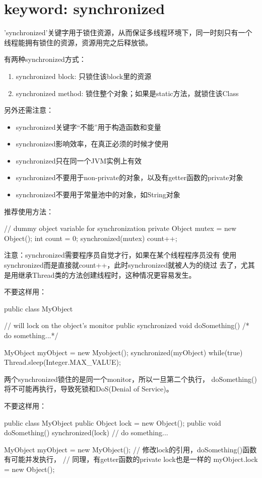\documentclass[a4paper,11pt]{article}
\begin{document}
\section[keyword: synchronized]{keyword: synchronized}
'synchronized'关键字用于锁住资源，从而保证多线程环境下，同一时刻只有一个
线程能拥有锁住的资源，资源用完之后释放锁。

有两种synchronized方式：
\begin{enumerate}
\item synchronized block: 只锁住该block里的资源
\item synchronized method: 锁住整个对象；如果是static方法，就锁住该Class
\end{enumerate}
另外还需注意：
\begin{itemize}
\item synchronized关键字“不能”用于构造函数和变量
\item synchronized影响效率，在真正必须的时候才使用
\item synchronized只在同一个JVM实例上有效
\item synchronized不要用于non-private的对象，以及有getter函数的private对象
\item synchronized不要用于常量池中的对象，如String对象
\end{itemize}
推荐使用方法：\\
\begin{javacode}
// dummy object variable for synchronization
private Object mutex = new Object();
int count = 0;
synchronized(mutex) {
    count++;
}
\end{javacode}

注意：synchronized需要程序员自觉才行，如果在某个线程程序员没有
使用synchronized而是直接就count++，此时synchronized就被人为的绕过
去了，尤其是用继承Thread类的方法创建线程时，这种情况更容易发生。

不要这样用：\\
\begin{javacode}
public class MyObject {
    // will lock on the object's monitor
    public synchronized void doSomething() { /* do something...*/ }

    MyObject myObject = new Myobject();
    synchronized(myObject) {
        while(true) {
            Thread.sleep(Integer.MAX_VALUE);
        }
    }
}
\end{javacode}

两个synchronized锁住的是同一个monitor，所以一旦第二个执行，
doSomething()将不可能再执行，导致死锁和DoS(Denial of Service)。

不要这样用：\\
\begin{javacode}
public class MyObject {
    public Object lock = new Object();
    public void doSomething() {
        synchronized(lock) {
            // do something...
        }
    }
}

MyObject myObject = new MyObject();
// 修改lock的引用，doSomething()函数有可能并发执行，
// 同理，有getter函数的private lock也是一样的
myObject.lock = new Object();
\end{javacode}
\end{document}
